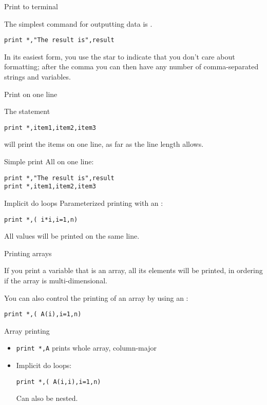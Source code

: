  {Print to terminal}

The simplest command for outputting data is .
\begin{lstlisting}
print *,"The result is",result
\end{lstlisting}
In its easiest form, you use the star to indicate that you don't care
about formatting; after the comma you can then have any number of
comma-separated strings and variables.

 {Print on one line}

The statement
\begin{lstlisting}
print *,item1,item2,item3
\end{lstlisting}
will print the items on one line, as far as the line length allows.

\begin{slide}{Simple print}
  \label{sl:fio-print}
  All on one line:
\begin{lstlisting}
print *,"The result is",result
print *,item1,item2,item3
\end{lstlisting}
\end{slide}

\begin{block}{Implicit do loops}
  \label{sl:print-implicit-loop}
  Parameterized printing with an :
\begin{lstlisting}
print *,( i*i,i=1,n)
\end{lstlisting}
All values will be printed on the same line.
\end{block}

 {Printing arrays}

If you print a variable that is an array, all its elements will be
printed, in  ordering if the array is
multi-dimensional.

You can also control the printing of an array by using an
:
\begin{lstlisting}
print *,( A(i),i=1,n)
\end{lstlisting}

\begin{slide}{Array printing}
  \label{sl:fprint-array}
  \begin{itemize}
  \item \lstinline{print *,A} prints whole array, column-major
  \item Implicit do loops:
\begin{lstlisting}
print *,( A(i,i),i=1,n)
\end{lstlisting}
  Can also be nested.
  \end{itemize}
\end{slide}

